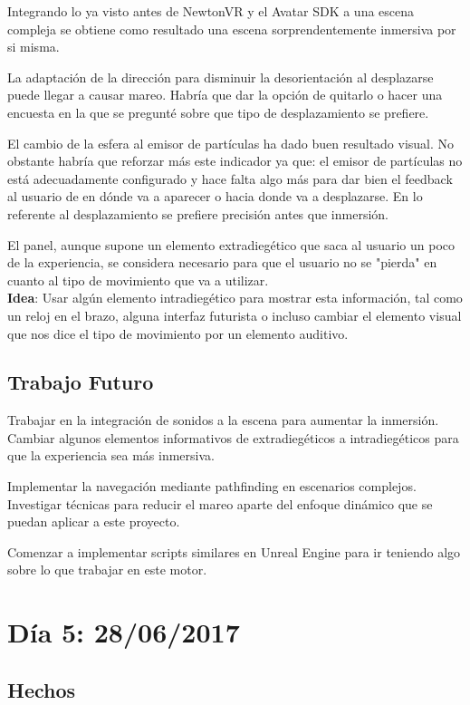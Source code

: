 \documentclass[12pt,a4paper]{article}
\begin{document}
Integrando lo ya visto antes de NewtonVR y el Avatar SDK a una escena compleja se obtiene como resultado una escena sorprendentemente inmersiva por si misma.

La adaptación de la dirección para disminuir la desorientación al desplazarse puede llegar a causar mareo. Habría que dar la opción de quitarlo o hacer una encuesta en la que se pregunté sobre que tipo de desplazamiento se prefiere.

El cambio de la esfera al emisor de partículas ha dado buen resultado visual. No obstante habría que reforzar más este indicador ya que: el emisor de partículas no está adecuadamente configurado y hace falta algo más para dar bien el feedback al usuario de en dónde va a aparecer o hacia donde va a desplazarse. En lo referente al desplazamiento se prefiere precisión antes que inmersión.

El panel, aunque supone un elemento extradiegético que saca al usuario un poco de la experiencia, se considera necesario para que el usuario no se "pierda" en cuanto al tipo de movimiento que va a utilizar.\\
\textbf{Idea}: Usar algún elemento intradiegético para mostrar esta información, tal como un reloj en el brazo, alguna interfaz futurista o incluso cambiar el elemento visual que nos dice el tipo de movimiento por un elemento auditivo.

\subsection{Trabajo Futuro}

Trabajar en la integración de sonidos a la escena para aumentar la inmersión.
Cambiar algunos elementos informativos de extradiegéticos a intradiegéticos para que la experiencia sea más inmersiva.

Implementar la navegación mediante pathfinding en escenarios complejos.
Investigar técnicas para reducir el mareo aparte del enfoque dinámico que se puedan aplicar a este proyecto.

Comenzar a implementar scripts similares en Unreal Engine para ir teniendo algo sobre lo que trabajar en este motor.

\section{Día 5: 28/06/2017}

\subsection{Hechos}
\end{document}
